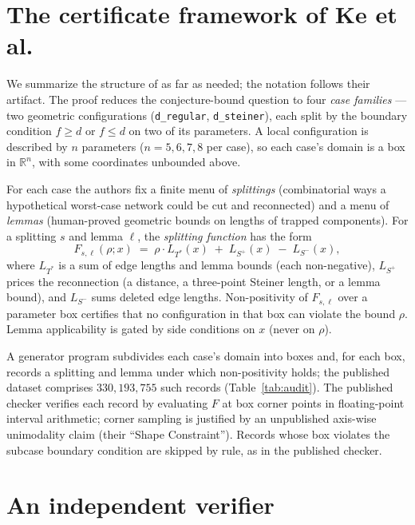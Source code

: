 \documentclass[11pt]{article}
\newcommand{\rr}{\rho}
\newcommand{\ts}{L_{T^*}}
\begin{document}
\section{The certificate framework of Ke et al.}\label{sec:framework}

We summarize the structure of \cite{PKU26} as far as needed; the
notation follows their artifact. The proof reduces the conjecture-bound
question to four \emph{case families} --- two geometric configurations
(\texttt{d\_regular}, \texttt{d\_steiner}), each split by the boundary
condition $f \ge d$ or $f \le d$ on two of its parameters. A local
configuration is described by $n$ parameters ($n = 5,6,7,8$ per case),
so each case's domain is a box in $\mathbb{R}^n$, with some coordinates
unbounded above.

For each case the authors fix a finite menu of \emph{splittings}
(combinatorial ways a hypothetical worst-case network could be cut and
reconnected) and a menu of \emph{lemmas} (human-proved geometric bounds
on lengths of trapped components). For a splitting $s$ and lemma $\ell$,
the \emph{splitting function} has the form
\begin{equation}\label{eq:F}
F_{s,\ell}(\rr; x) \;=\; \rr \cdot \ts(x) \;+\; L_{S^+}(x) \;-\;
L_{S^-}(x),
\end{equation}
where $\ts$ is a sum of edge lengths and lemma bounds (each
non-negative), $L_{S^+}$ prices the reconnection (a distance, a
three-point Steiner length, or a lemma bound), and $L_{S^-}$ sums deleted
edge lengths. Non-positivity of $F_{s,\ell}$ over a parameter box
certifies that no configuration in that box can violate the bound $\rr$.
Lemma applicability is gated by side conditions on $x$ (never on $\rr$).

A generator program subdivides each case's domain into boxes and, for
each box, records a splitting and lemma under which non-positivity holds;
the published dataset comprises $330{,}193{,}755$ such records
(Table~\ref{tab:audit}). The published checker verifies each record by
evaluating $F$ at box corner points in floating-point interval
arithmetic; corner sampling is justified by an unpublished axis-wise
unimodality claim (their ``Shape Constraint''). Records whose box
violates the subcase boundary condition are skipped by rule, as in the
published checker.

\section{An independent verifier}\label{sec:verifier}
\end{document}
